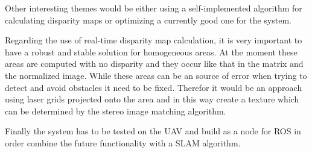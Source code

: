 \documentclass[11pt]{article}
\begin{document}
Other interesting themes would be either using a self-implemented algorithm for calculating disparity maps or optimizing a currently good one for the system.

Regarding the use of real-time disparity map calculation, it is very important to have a robust and stable solution for homogeneous areas. At the moment these areas are computed with no disparity and they occur like that in the matrix and the normalized image. While these areas can be an source of error when trying to detect and avoid obstacles it need to be fixed. Therefor it would be an approach using laser grids projected onto the area and in this way create a texture which can be determined by the stereo image matching algorithm.

Finally the system has to be tested on the UAV and build as a node for ROS \cite{ROSFRAMEWORK} in order combine the future functionality with a SLAM algorithm.

\nocite{*}


\end{document}
